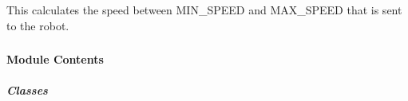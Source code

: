 \documentclass[letterpaper,10pt,english]{sphinxmanual}
\begin{document}
\begin{fulllineitems}
\begin{fulllineitems}
\end{fulllineitems}


\begin{fulllineitems}
\label{\detokenize{autoapi/robotlibrary/rc/index:robotlibrary.rc.RC.set_speed}}
\pysigstartsignatures
{}
\pysigstopsignatures
\sphinxAtStartPar
This calculates the speed between MIN\_SPEED and MAX\_SPEED that is sent to the robot.

\end{fulllineitems}


\end{fulllineitems}


\begin{fulllineitems}
\label{\detokenize{autoapi/robotlibrary/rc/index:robotlibrary.rc.main}}
\pysigstartsignatures
{}
\pysigstopsignatures
\end{fulllineitems}


\sphinxstepscope


\subsubsection{}
\label{\detokenize{autoapi/robotlibrary/robot/index:module-robotlibrary.robot}}\label{\detokenize{autoapi/robotlibrary/robot/index:robotlibrary-robot}}\label{\detokenize{autoapi/robotlibrary/robot/index::doc}}

\paragraph{Module Contents}
\label{\detokenize{autoapi/robotlibrary/robot/index:module-contents}}

\subparagraph{Classes}
\label{\detokenize{autoapi/robotlibrary/robot/index:classes}}
\end{document}
